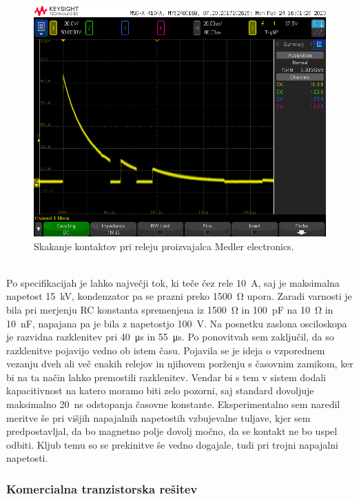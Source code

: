\documentclass[a4paper,twoside,openright,12pt,Slovene]{book}
\begin{document}
    \begin{figure}[H]
        \centering
        \includegraphics[width=1\columnwidth]{Slike/MedlerElectronicsRele.png}
        \caption{\label{BlokDiagramShema} Skakanje kontaktov pri releju proizvajalca Medler electronics.}
    \end{figure}
    
    ~\\Po specifikacijah je lahko največji tok, ki teče čez rele \SI{10}{\ampere}, saj je maksimalna napetost \SI{15}{\kilo\volt}, kondenzator pa se prazni preko \SI{1500}{\ohm} upora. Zaradi varnosti je bila pri merjenju RC konstanta spremenjena iz \SI{1500}{\ohm} in \SI{100}{\pico\farad} na \SI{10}{\ohm} in \SI{10}{\nano\farad}, napajana pa je bila z napetostjo \SI{100}{\volt}. Na posnetku zaslona osciloskopa je razvidna razklenitev pri \SI{40}{\micro\second} in \SI{55}{\micro\second}. Po ponovitvah sem zaključil, da so razklenitve pojavijo vedno ob istem času. Pojavila se je ideja o vzporednem vezanju dveh ali več enakih relejov in njihovem porženju s časovnim zamikom, ker bi na ta način lahko premostili razklenitev. Vendar bi s tem v sistem dodali kapacitivnost na katero moramo biti zelo pozorni, saj standard dovoljuje maksimalno \SI{20}{\nano\second} odstopanja časovne konstante.
Eksperimentalno sem naredil meritve še pri višjih napajalnih napetostih vzbujevalne tuljave, kjer sem predpostavljal, da bo magnetno polje dovolj močno, da se kontakt ne bo uspel odbiti. Kljub temu so se prekinitve še vedno dogajale, tudi pri trojni napajalni napetosti.
   
	\subsubsection{Komercialna tranzistorska rešitev} \label{Komercialna tranzistorska rešitev}   
    
\end{document}
